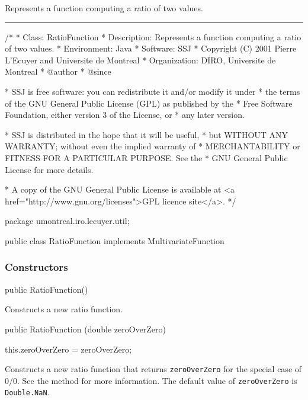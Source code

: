 
Represents a function computing a ratio of two values.

\bigskip\hrule

\begin{code}
\begin{hide}
/*
 * Class:        RatioFunction
 * Description:  Represents a function computing a ratio of two values.
 * Environment:  Java
 * Software:     SSJ 
 * Copyright (C) 2001  Pierre L'Ecuyer and Universite de Montreal
 * Organization: DIRO, Universite de Montreal
 * @author       
 * @since

 * SSJ is free software: you can redistribute it and/or modify it under
 * the terms of the GNU General Public License (GPL) as published by the
 * Free Software Foundation, either version 3 of the License, or
 * any later version.

 * SSJ is distributed in the hope that it will be useful,
 * but WITHOUT ANY WARRANTY; without even the implied warranty of
 * MERCHANTABILITY or FITNESS FOR A PARTICULAR PURPOSE.  See the
 * GNU General Public License for more details.

 * A copy of the GNU General Public License is available at
   <a href="http://www.gnu.org/licenses">GPL licence site</a>.
 */
\end{hide}
package umontreal.iro.lecuyer.util;\begin{hide}
\end{hide}


public class RatioFunction implements MultivariateFunction\begin{hide} {
   private double zeroOverZero = Double.NaN;
\end{hide}
\end{code}
\subsubsection*{Constructors}
\begin{code}

   public RatioFunction()\begin{hide} {}\end{hide}
\end{code}
\begin{tabb}   Constructs a new ratio function.
\end{tabb}
\begin{code}

   public RatioFunction (double zeroOverZero)\begin{hide} {
      this.zeroOverZero = zeroOverZero;
   }\end{hide}
\end{code}
\begin{tabb}   Constructs a new ratio function that returns
   \texttt{zeroOverZero} for the special case of $0/0$.
   See the   method for more information.
   The default value of \texttt{zeroOverZero} is \texttt{Double.NaN}.
\end{tabb}
\begin{htmlonly}
\end{htmlonly}
